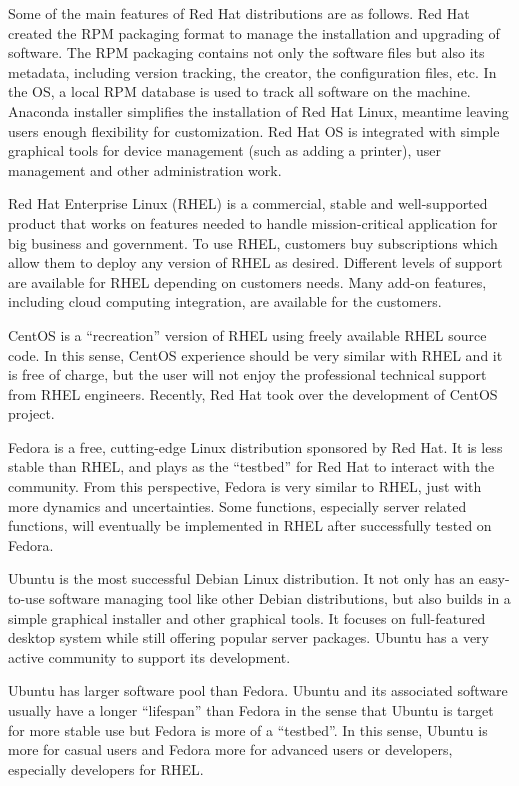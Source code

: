 Some of the main features of Red Hat distributions are as follows. Red Hat created the RPM packaging format to manage the installation and upgrading of software. The RPM packaging contains not only the software files but also its metadata, including version tracking, the creator, the configuration files, etc. In the OS, a local RPM database is used to track all software on the machine. Anaconda installer simplifies the installation of Red Hat Linux, meantime leaving users enough flexibility for customization. Red Hat OS is integrated with simple graphical tools for device management (such as adding a printer), user management and other administration work.

Red Hat Enterprise Linux (RHEL) is a commercial, stable and well-supported product that works on features needed to handle mission-critical application for big business and government. To use RHEL, customers buy subscriptions which allow them to deploy any version of RHEL as desired. Different levels of support are available for RHEL depending on customers needs. Many add-on features, including cloud computing integration, are available for the customers.

CentOS is a ``recreation'' version of RHEL using freely available RHEL source code. In this sense, CentOS experience should be very similar with RHEL and it is free of charge, but the user will not enjoy the professional technical support from RHEL engineers.
Recently, Red Hat took over the development of CentOS project.

Fedora is a free, cutting-edge Linux distribution sponsored by Red Hat. It is less stable than RHEL, and plays as the ``testbed'' for Red Hat to interact with the community. From this perspective, Fedora is very similar to RHEL, just with more dynamics and uncertainties. Some functions, especially server related functions, will eventually be implemented in RHEL after successfully tested on Fedora.

Ubuntu is the most successful Debian Linux distribution. It not only has an easy-to-use software managing tool like other Debian distributions, but also builds in a simple graphical installer and other graphical tools. It focuses on full-featured desktop system while still offering popular server packages. Ubuntu has a very active community to support its development.

Ubuntu has larger software pool than Fedora. Ubuntu and its associated software usually have a longer ``lifespan'' than Fedora in the sense that Ubuntu is target for more stable use but Fedora is more of a ``testbed''. In this sense, Ubuntu is more for casual users and Fedora more for advanced users or developers, especially developers for RHEL.


